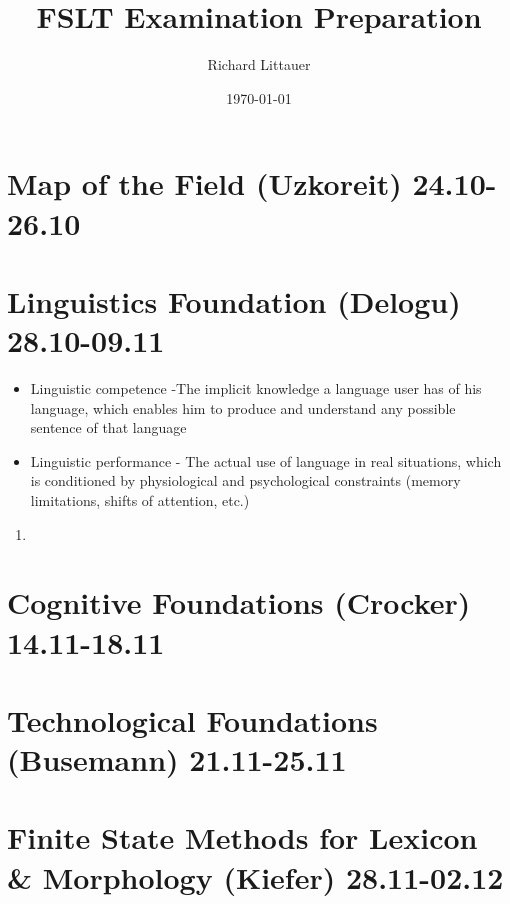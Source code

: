 \documentclass[11pt]{article}
\title{FSLT Examination Preparation}
\author{Richard Littauer}		%
\date{\today}                          		%
\begin{document}
\maketitle


\section{Map of the Field (Uzkoreit) 24.10-26.10}

\section{Linguistics Foundation (Delogu) 28.10-09.11}
\begin{itemize}{}{$\bullet$}
 \item Linguistic competence -The implicit knowledge a language user has of his language, which enables him to produce and understand any possible sentence of that language
 \item Linguistic performance - The actual use of language in real situations, which is conditioned by physiological and psychological constraints (memory limitations, shifts of attention, etc.)
\end{itemize}

\begin{enumerate}
 \item
\end{enumerate}
\section{ Cognitive Foundations (Crocker) 14.11-18.11}

\section{Technological Foundations (Busemann) 21.11-25.11}

\section{Finite State Methods for Lexicon \& Morphology (Kiefer) 28.11-02.12}
\end{document}
